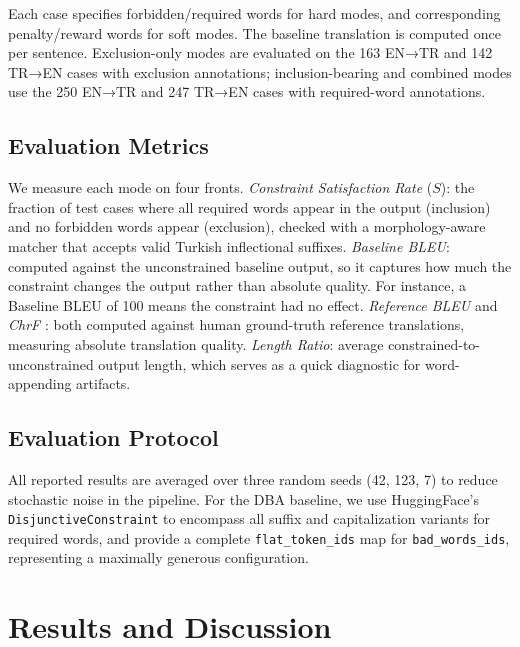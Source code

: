 \documentclass[conference]{IEEEtran}
\begin{document}
Each case specifies forbidden/required words for hard modes, and corresponding penalty/reward words for soft modes. The baseline translation is computed once per sentence. Exclusion-only modes are evaluated on the 163 EN→TR and 142 TR→EN cases with exclusion annotations; inclusion-bearing and combined modes use the 250 EN→TR and 247 TR→EN cases with required-word annotations.

\subsection{Evaluation Metrics}

We measure each mode on four fronts. \emph{Constraint Satisfaction Rate} ($S$): the fraction of test cases where all required words appear in the output (inclusion) and no forbidden words appear (exclusion), checked with a morphology-aware matcher that accepts valid Turkish inflectional suffixes. \emph{Baseline BLEU}: computed against the unconstrained baseline output, so it captures how much the constraint changes the output rather than absolute quality. For instance, a Baseline BLEU of 100 means the constraint had no effect. \emph{Reference BLEU} \cite{papineni2002bleu} and \emph{ChrF} \cite{popovic2015chrf}: both computed against human ground-truth reference translations, measuring absolute translation quality. \emph{Length Ratio}: average constrained-to-unconstrained output length, which serves as a quick diagnostic for word-appending artifacts.

\subsection{Evaluation Protocol}

All reported results are averaged over three random seeds (42, 123, 7) to reduce stochastic noise in the pipeline. For the DBA baseline, we use HuggingFace's \texttt{DisjunctiveConstraint} to encompass all suffix and capitalization variants for required words, and provide a complete \texttt{flat\_token\_ids} map for \texttt{bad\_words\_ids}, representing a maximally generous configuration.

\section{Results and Discussion}
\end{document}
